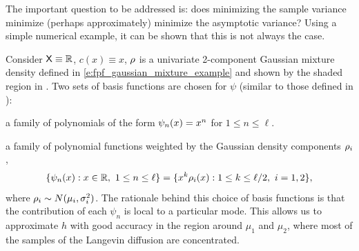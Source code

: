The important question to be addressed is: does minimizing the sample variance minimize (perhaps approximately) minimize the asymptotic variance? Using a simple numerical example, it can be shown that this is not always the case.

Consider ${\sf X} \equiv \mathbb{R}$, $c(x) \equiv x $, $\rho$ is a univariate 2-component Gaussian mixture density defined in \eqref{e:fpf_gaussian_mixture_example} and shown by the shaded region in . Two sets of basis functions are chosen for $\psi$ (similar to those defined in ):
\begin{romannum}
	\item  a family of polynomials of the form $\psi_n(x) = x^n$ for $1 \leq n \leq \ell$.
	\item a family of polynomial functions weighted by the Gaussian density components $\rho_i$,
	\begin{equation}
	\{\psi_n(x) : x\in\Re,\ 1\le n\le \ell\}  = \{ x^k \pr_i(x) :  1\le k \le \ell/2,   \ i=1,2\},
	\label{e:basis}
	\end{equation}
	where $\rho_i \sim N(\mu_i, \sigma^2_i)$. The rationale behind this choice of basis functions is that the contribution of each $\psi_n$ is local to a particular mode.  This allows us to approximate $h$ with good accuracy in the region around $\mu_1$ and $\mu_2$, where most of the samples of the Langevin diffusion are concentrated. 
\end{romannum}

